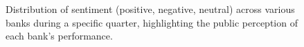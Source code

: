 {\begin{figure}[t]
  \begin{center}
  \end{center}
  \caption{\small Distribution of sentiment (positive, negative, neutral) across various banks during a specific quarter, highlighting the public perception of each bank's performance.}
\label{fig:bank_dist}%
\end{figure}

}
